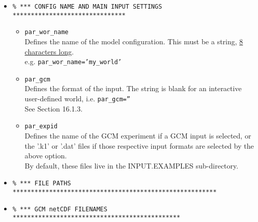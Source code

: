 \documentclass[11pt,fleqn]{book} %
\begin{document}
\begin{itemize}

\vspace{2mm}
\item []
\small\vspace{-2pt}\begin{verbatim}
% *** CONFIG NAME AND MAIN INPUT SETTINGS *******************************
\end{verbatim}\vspace{-2pt}\normalsize

\begin{itemize}[noitemsep]
\vspace{1mm}

\item [] \texttt{par\_wor\_name}
\\Defines the name of the model configuration. This must be a string, \uline{8 characters long}.
\\e.g. \texttt{par\_wor\_name='my\_world'}

\item [] \texttt{par\_gcm}
\\Defines the format of the input. The string is blank for an interactive user-defined world, i.e. \texttt{par\_gcm=''}
\\See Section 16.1.3.

\item [] \texttt{par\_expid}
\\Defines the name of the GCM experiment if a GCM input is selected, or the '\textsf{\small .k1}' or '\textsf{\small .dat}' files if those respective input formats are selected by the above option.
\\By default, these files live in the \textsf{\small INPUT.EXAMPLES} sub-directory.

\end{itemize}

\vspace{2mm}
\item []
\small\vspace{-2pt}\begin{verbatim}
% *** FILE PATHS ********************************************************
\end{verbatim}\vspace{-2pt}\normalsize

\vspace{2mm}
\item []
\small\vspace{-2pt}\begin{verbatim}
% *** GCM netCDF FILENAMES **********************************************
\end{verbatim}\vspace{-2pt}\normalsize


\end{itemize}
\end{document}
